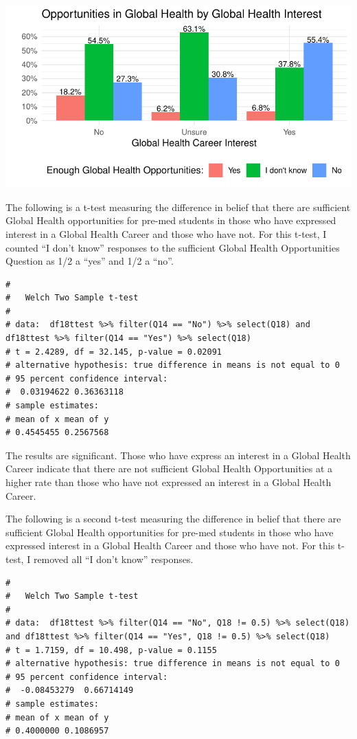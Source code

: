 \documentclass[
  letterpaper,
  DIV=11,
  numbers=noendperiod]{scrartcl}
\begin{document}
\includegraphics{GlobalHealthQuartoHC_files/figure-pdf/unnamed-chunk-31-1.pdf}

\newpage

The following is a t-test measuring the difference in belief that there
are sufficient Global Health opportunities for pre-med students in those
who have expressed interest in a Global Health Career and those who have
not. For this t-test, I counted ``I don't know'' responses to the
sufficient Global Health Opportunities Question as 1/2 a ``yes'' and 1/2
a ``no''.

\begin{verbatim}
# 
#   Welch Two Sample t-test
# 
# data:  df18ttest %>% filter(Q14 == "No") %>% select(Q18) and df18ttest %>% filter(Q14 == "Yes") %>% select(Q18)
# t = 2.4289, df = 32.145, p-value = 0.02091
# alternative hypothesis: true difference in means is not equal to 0
# 95 percent confidence interval:
#  0.03194622 0.36363118
# sample estimates:
# mean of x mean of y 
# 0.4545455 0.2567568
\end{verbatim}

The results are significant. Those who have express an interest in a
Global Health Career indicate that there are not sufficient Global
Health Opportunities at a higher rate than those who have not expressed
an interest in a Global Health Career.

The following is a second t-test measuring the difference in belief that
there are sufficient Global Health opportunities for pre-med students in
those who have expressed interest in a Global Health Career and those
who have not. For this t-test, I removed all ``I don't know'' responses.

\begin{verbatim}
# 
#   Welch Two Sample t-test
# 
# data:  df18ttest %>% filter(Q14 == "No", Q18 != 0.5) %>% select(Q18) and df18ttest %>% filter(Q14 == "Yes", Q18 != 0.5) %>% select(Q18)
# t = 1.7159, df = 10.498, p-value = 0.1155
# alternative hypothesis: true difference in means is not equal to 0
# 95 percent confidence interval:
#  -0.08453279  0.66714149
# sample estimates:
# mean of x mean of y 
# 0.4000000 0.1086957
\end{verbatim}
\end{document}
